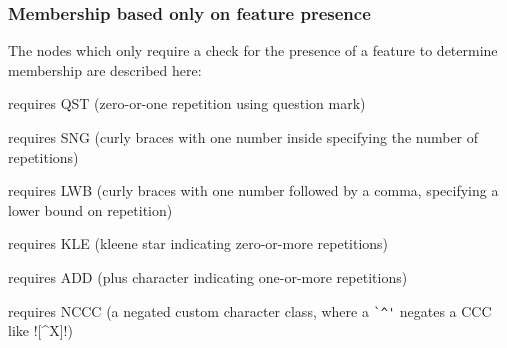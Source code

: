 \subsubsection{Membership based only on feature presence}
The nodes which only require a check for the presence of a feature to determine membership are described here:
\begin{description} \itemsep -1pt
\item[D2] requires QST (zero-or-one repetition using question mark)
\item[S1] requires SNG (curly braces with one number inside specifying the number of repetitions)
\item[L1] requires LWB (curly braces with one number followed by a comma, specifying a lower bound on repetition)
\item[L2] requires KLE (kleene star indicating zero-or-more repetitions)
\item[L3] requires ADD (plus character indicating one-or-more repetitions)
\item[C3] requires NCCC (a negated custom character class, where a \verb!`^'! negates a CCC like \cverb![^X]!)
\end{description}

